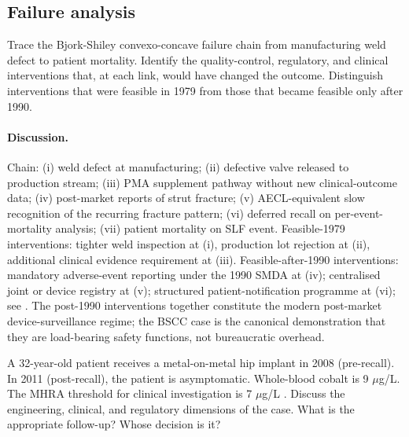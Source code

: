 \subsection*{Failure analysis}

\begin{exercise}
Trace the Bjork-Shiley convexo-concave failure chain from
manufacturing weld defect to patient mortality. Identify the
quality-control, regulatory, and clinical interventions that, at
each link, would have changed the outcome. Distinguish
interventions that were feasible in 1979 from those that became
feasible only after 1990.
\end{exercise}

\paragraph{Discussion.}
Chain: (i) weld defect at manufacturing; (ii) defective valve
released to production stream; (iii) PMA supplement pathway without
new clinical-outcome data; (iv) post-market reports of strut
fracture; (v) AECL-equivalent slow recognition of the recurring
fracture pattern; (vi) deferred recall on per-event-mortality
analysis; (vii) patient mortality on SLF event. Feasible-1979
interventions: tighter weld inspection at (i), production lot
rejection at (ii), additional clinical evidence requirement at
(iii). Feasible-after-1990 interventions: mandatory adverse-event
reporting under the 1990 SMDA at (iv); centralised joint or device
registry at (v); structured patient-notification programme at
(vi); see \cite{law:v6c12-safe-medical-devices-act-1990,
acc:bjork-shiley-cc-1979-1986}. The post-1990 interventions
together constitute the modern post-market device-surveillance
regime; the BSCC case is the canonical demonstration that they are
load-bearing safety functions, not bureaucratic overhead.

\begin{exercise}
A 32-year-old patient receives a metal-on-metal hip implant in
2008 (pre-recall). In 2011 (post-recall), the patient is
asymptomatic. Whole-blood cobalt is 9 $\mu$g/L. The MHRA threshold
for clinical investigation is 7 $\mu$g/L
\cite{web:v6c12-mhra-mom-2012}. Discuss the engineering, clinical,
and regulatory dimensions of the case. What is the appropriate
follow-up? Whose decision is it?
\end{exercise}


